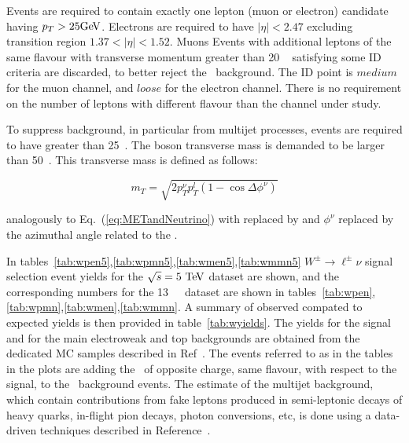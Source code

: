 Events are required to contain exactly one lepton (muon or electron) candidate having $p_T > 25\text{Ge\kern -0.1em V}$. Electrons are required to have $|\eta|<2.47$ excluding transition region $1.37 < |\eta|< 1.52$. Muons   
Events with additional leptons of the same flavour with transverse momentum greater than 20 ~\GeV{} satisfying some ID criteria are discarded, to better reject the \Zboson\ background. The ID point is $medium$ for the muon channel, and $loose$ for the electron channel. There is no requirement on the number of leptons with different flavour than the channel under study.

To suppress background, in particular from multijet processes,
events are required to have \MET{} greater than 25~\GeV{}.
The \Wboson{} boson transverse mass \mt{} is demanded to be larger than 50~\GeV.
This transverse mass is defined as follows:

\begin{equation}\label{eq:mt}
{m}_{T} = \sqrt{2 {p}_{T}^{\nu}p_{T} ^{l} (1-\cos\Delta\phi^{\nu})}
\end{equation}

analogously to Eq.~(\ref{eq:METandNeutrino}) with \ptn{} replaced by \MET{}
and $\phi^{\nu}$ replaced by the azimuthal angle related to the \MET{}.

In tables~\ref{tab:wpen5},\ref{tab:wpmn5},\ref{tab:wmen5},\ref{tab:wmmn5} $W^{\pm} \rightarrow \ell^{\pm}\nu$ signal selection event yields for the $\sqrt{s} = 5~\text{Te\kern -0.1em V}$ \lowmu dataset are shown, and the corresponding numbers for the 13~\TeV\ \lowmu\ dataset are shown
in tables~\ref{tab:wpen},\ref{tab:wpmn},\ref{tab:wmen},\ref{tab:wmmn}. A summary of observed compated to expected yields is then provided in table~\ref{tab:wyields}.
The yields for the signal and for the main electroweak and top backgrounds are obtained from the dedicated MC samples described in Ref~\cite{Kretzschmar:2657141}.
The events referred to as \Wln{} in the tables in the plots are adding the \Wboson\ of opposite charge, same flavour, with respect to the signal, to the \Wtaunu\ background events.
The estimate of the multijet background, which contain contributions from fake leptons produced in semi-leptonic decays of heavy quarks, in-flight pion decays, photon conversions, etc, is done using a data-driven techniques described in Reference~\cite{Xu:2657146}.



\clearpage



